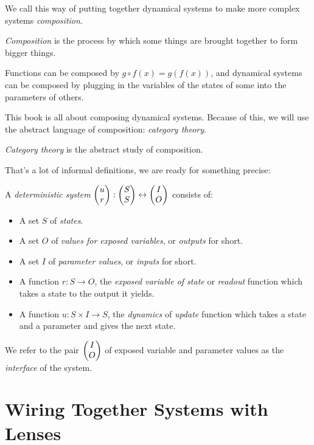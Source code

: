 \documentclass[DynamicalBook]{subfiles}
\begin{document}
We call this way of putting together dynamical systems to make more complex
systems \emph{composition}.
\begin{informal}
  \emph{Composition} is the process by which some things are brought together to
  form bigger things.

  Functions can be composed by $g \circ f(x) = g(f(x))$, and dynamical systems
  can be composed by plugging in the variables of the states of some into the
  parameters of others.
\end{informal}

This book is all about composing dynamical systems. Because of this, we will use
the abstract language of composition: \emph{category theory}.
\begin{informal}
\emph{Category theory} is the abstract study of composition.
\end{informal}


That's a lot of informal definitions, we are ready for something precise:
\begin{definition}
  A \emph{deterministic system} $\begin{pmatrix}{u} \\ {r} \end{pmatrix} : \begin{pmatrix}{S} \\ {S} \end{pmatrix} \leftrightarrow \begin{pmatrix}{I} \\ {O} \end{pmatrix}$ consists of:
  \begin{itemize}
    \item A set $S$ of \emph{states}.
    \item A set $O$ of \emph{values for exposed variables}, or \emph{outputs}
      for short.
    \item A set $I$ of \emph{parameter values}, or \emph{inputs} for short.
    \item A function $r : S \to O$, the \emph{exposed variable of state} or
      \emph{readout} function which takes a state to the output it yields. 
    \item A function $u : S \times I \to S$, the \emph{dynamics} of
      \emph{update} function which takes a state and a parameter and gives the
      next state.
  \end{itemize}
  We refer to the pair $\begin{pmatrix}{I} \\ {O} \end{pmatrix}$ of exposed variable and parameter values as
  the \emph{interface} of the system.
\end{definition}

\section{Wiring Together Systems with Lenses}
\end{document}
